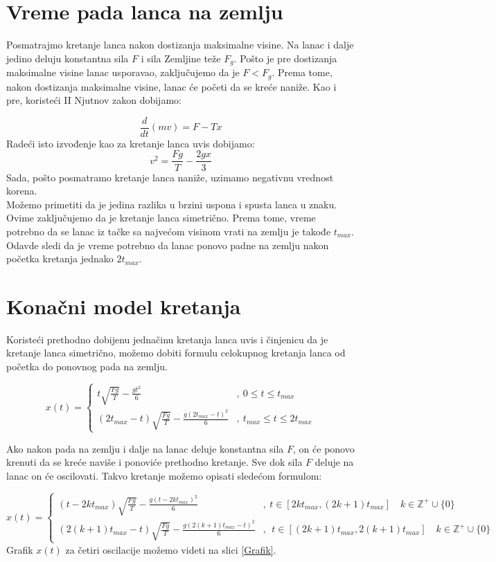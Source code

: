 \documentclass[a4paper]{article}
\begin{document}
\section{Vreme pada lanca na zemlju}

Posmatrajmo kretanje lanca nakon dostizanja maksimalne visine.
Na lanac i dalje jedino deluju konstantna sila $F$ i sila Zemljine
teže $F_{g}$. Pošto je pre dostizanja maksimalne visine lanac
usporavao, zaključujemo da je $F<F_{g}$. Prema tome, nakon
dostizanja maksimalne visine, lanac će početi da se kreće naniže. 
Kao i pre, koristeći II Njutnov zakon dobijamo:

\[
\frac{d}{dt}\left(mv\right)=F-Tx 
\]
Radeći isto izvođenje kao za kretanje lanca uvis dobijamo:
\[
v^{2} = \frac{Fg}{T} - \frac{2gx}{3}
\]
Sada, pošto posmatramo kretanje lanca naniže, uzimamo negativnu
vrednost korena.\\

Možemo primetiti da je jedina razlika u brzini uspona i spusta
lanca u znaku. Ovime zaključujemo da je kretanje lanca simetrično.
Prema tome, vreme potrebno da se lanac iz tačke sa najvećom visinom
vrati na zemlju je takođe $t_{max}$. Odavde sledi da je vreme
potrebno da lanac ponovo padne na zemlju nakon početka kretanja
jednako $2t_{max}$.

\section{Konačni model kretanja}

Koristeći prethodno dobijenu jednačinu kretanja lanca uvis i
činjenicu da je kretanje lanca simetrično, možemo dobiti formulu
celokupnog kretanja lanca od početka do ponovnog pada na zemlju.

\[
x\left(t\right) = 
\begin{cases}
t\sqrt{\frac{Fg}{T}} - \frac{gt^{2}}{6} & ,\ 0 \le t \le t_{max} \\
\left(2t_{max} - t\right)\sqrt{\frac{Fg}{T}} - \frac{g\left(2t_{max} -t\right)^{2}}{6} & ,\ t_{max} \le t \le 2t_{max}
\end{cases}
\]

Ako nakon pada na zemlju i dalje na lanac deluje konstantna
sila $F$, on će ponovo krenuti da se kreće naviše i ponoviće
prethodno kretanje. Sve dok sila $F$ deluje na lanac on će oscilovati.
Takvo kretanje možemo opisati sledećom formulom:

\[
x\left(t\right) = 
\begin{cases}
\left(t-2kt_{max}\right)\sqrt{\frac{Fg}{T}} - \frac{g\left(t - 2kt_{max}\right)^{2}}{6} & ,\ t \in [2kt_{max}, \left(2k+1\right)t_{max}] \quad k \in \mathbb{Z}^{+}\cup\{0\} \\
\left(2\left(k+1\right)t_{max} - t\right)\sqrt{\frac{Fg}{T}} - \frac{g\left(2\left(k+1\right)t_{max} -t\right)^{2}}{6} & ,\ \ t \in [\left(2k+1\right)t_{max}, 2\left(k+1\right)t_{max}] \quad k \in \mathbb{Z}^{+}\cup\{0\}
\end{cases}
\]
Grafik $x(t)$ za četiri oscilacije možemo videti na slici \ref{Grafik}.
\end{document}
